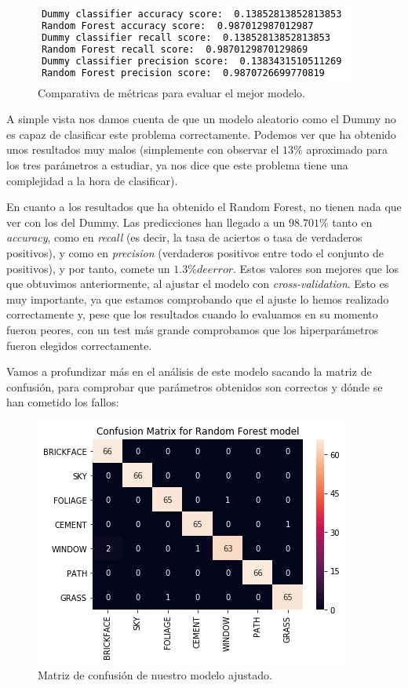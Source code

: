 \documentclass[11pt,a4paper]{article}
\begin{document}
\begin{figure}[H]
    \centering
    \includegraphics{img/model-comp-scores.png}
    \caption{Comparativa de métricas para evaluar el mejor modelo.}
    \label{fig:model-comp-scores}
\end{figure}

A simple vista nos damos cuenta de que un modelo aleatorio como el Dummy no es capaz de clasificar este problema correctamente. Podemos ver que ha obtenido unos resultados muy malos (simplemente con observar el $13\%$ aproximado para los tres parámetros a estudiar, ya nos dice que este problema tiene una complejidad a la hora de clasificar).

En cuanto a los resultados que ha obtenido el Random Forest, no tienen nada que ver con los del Dummy. Las predicciones han llegado a un $98.701\%$ tanto en \textit{accuracy}, como en \textit{recall} (es decir, la tasa de aciertos o tasa de verdaderos positivos), y como en \textit{precision} (verdaderos positivos entre todo el conjunto de positivos), y por tanto, comete un $1.3\% de error$. Estos valores son mejores que los que obtuvimos anteriormente, al ajustar el modelo con \textit{cross-validation}. Esto es muy importante, ya que estamos comprobando que el ajuste lo hemos realizado correctamente y, pese que los resultados cuando lo evaluamos en su momento fueron peores, con un test más grande comprobamos que los hiperparámetros fueron elegidos correctamente.

Vamos a profundizar más en el análisis de este modelo sacando la matriz de confusión, para comprobar que parámetros obtenidos son correctos y dónde se han cometido los fallos:

\begin{figure}[H]
    \centering
    \includegraphics[scale=0.7]{img/confusion-matrix.png}
    \caption{Matriz de confusión de nuestro modelo ajustado.}
    \label{fig:confusion-matrix}
\end{figure}
\end{document}
